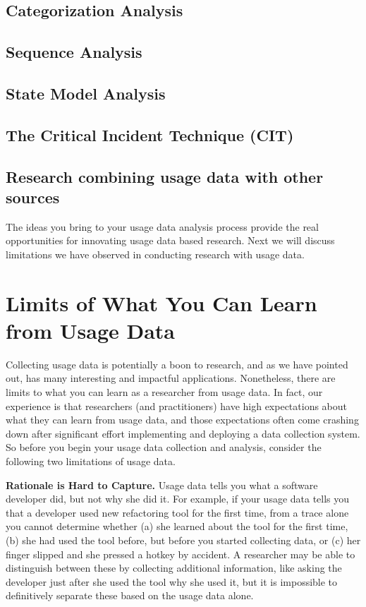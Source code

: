 \subsection{Categorization Analysis}


\subsection{Sequence Analysis}


\subsection{State Model Analysis}


\subsection{The Critical Incident Technique (CIT)}


\subsection{Research combining usage data with other sources}



The ideas you bring to your usage data analysis process provide the real opportunities for innovating usage data based research.  Next we will discuss limitations we have observed in conducting research with usage data.

\section{Limits of What You Can Learn from Usage Data}
\label{sec:limitations}

Collecting usage data is potentially a boon to research, and as we have
pointed out, has many interesting and impactful applications.
Nonetheless, there are limits to what you can learn as a researcher
from usage data.
In fact, our experience is that researchers (and practitioners) have 
high expectations about what they can learn from usage data, and those
expectations often come crashing down after significant effort implementing
and deploying a data collection system.
So before you begin your usage data collection and analysis, consider
the following two limitations of usage data.

\textbf{Rationale is Hard to Capture.}
Usage data tells you what a software developer did, but not
why she did it.
For example, if your usage data tells you that a developer used 
new refactoring tool for the first time, from a trace alone you cannot determine whether
(a) she learned about the tool for the first time, (b) she had used the tool before,
but before you started collecting data, or (c) her finger slipped and 
she pressed a hotkey by accident.
A researcher may be able to distinguish between these by collecting additional information,
like asking the developer just after she used the tool why she used it,
but it is impossible to definitively separate these based on the 
usage data alone.

